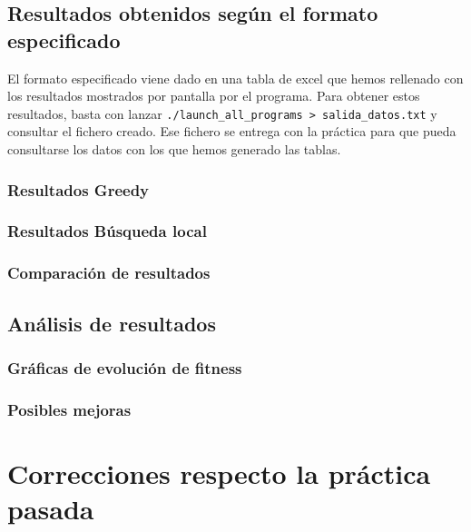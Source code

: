 \documentclass[11pt]{article}
\begin{document}
\pagebreak

\subsection{Resultados obtenidos según el formato especificado}

El formato especificado viene dado en una tabla de excel que hemos rellenado con los resultados mostrados por pantalla por el programa. Para obtener estos resultados, basta con lanzar \lstinline{./launch_all_programs > salida_datos.txt} y consultar el fichero creado. Ese fichero se entrega con la práctica para que pueda consultarse los datos con los que hemos generado las tablas.

\subsubsection{Resultados Greedy}

\subsubsection{Resultados Búsqueda local}

\subsubsection{Comparación de resultados}


\subsection{Análisis de resultados}

\subsubsection{Gráficas de evolución de fitness}

\subsubsection{Posibles mejoras}

\pagebreak

\section{Correcciones respecto la práctica pasada}
\end{document}
